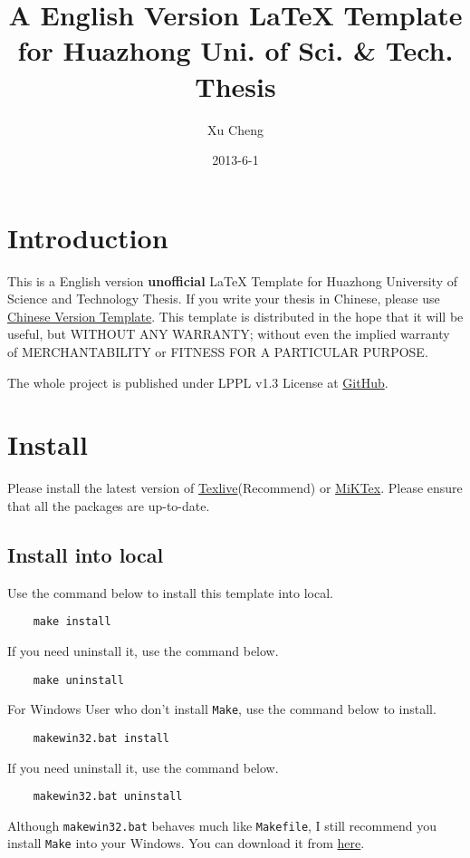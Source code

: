 \documentclass[12pt,a4paper,numbered,full]{l3doc}
\begin{document}
\title{A English Version \LaTeX{} Template for Huazhong Uni. of Sci. \& Tech. Thesis}
\author{Xu Cheng}
\date{2013-6-1}

\maketitle

\tableofcontents

\section{Introduction}

This is a English version \textbf{unofficial} LaTeX Template for Huazhong University of Science and Technology Thesis. If you write your thesis in Chinese, please use \href{https://github.com/michael911009/HUSTThesis}{Chinese Version Template}. This template is distributed in the hope that it will be useful, but WITHOUT ANY WARRANTY; without even the implied warranty of MERCHANTABILITY or FITNESS FOR A PARTICULAR PURPOSE.

The whole project is published under LPPL v1.3 License at \href{https://github.com/michael911009/HUSTThesis-en}{GitHub}.

\section{Install}

Please install the latest version of \href{http://www.tug.org/texlive/}{Texlive}(Recommend) or \href{http://miktex.org/}{MiKTex}. Please ensure that all the packages are up-to-date.

\subsection{Install into local}

Use the command below to install this template into local.
\begin{verbatim}
    make install
\end{verbatim}
If you need uninstall it, use the command below.
\begin{verbatim}
    make uninstall
\end{verbatim}

For Windows User who don't install \texttt{Make}, use the command below
to install. 
\begin{verbatim}
    makewin32.bat install
\end{verbatim}
If you need uninstall it, use the command below.
\begin{verbatim}
    makewin32.bat uninstall
\end{verbatim}
Although \texttt{makewin32.bat} behaves much like \texttt{Makefile}, I still
recommend you install \texttt{Make} into your Windows. You can download
it from \href{http://gnuwin32.sourceforge.net/packages/make.htm}{here}.
\end{document}
